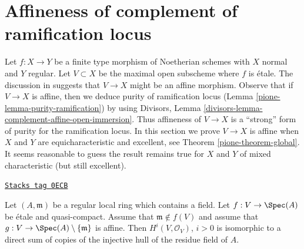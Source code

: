 \section{Affineness of complement of ramification locus}
\label{pione-section-stronger-purity}
Let $f : X \to Y$ be a finite type morphism of Noetherian schemes
with $X$ normal and $Y$ regular. Let $V \subset X$ be the maximal
open subscheme where $f$ is \'etale.
The discussion in \cite[Chapter IV, Section 21.12]{EGA}
suggests that $V \to X$ might be an affine morphism.
Observe that if $V \to X$ is affine, then we deduce purity of
ramification locus (Lemma \ref{pione-lemma-purity-ramification}) by
using Divisors, Lemma \ref{divisors-lemma-complement-affine-open-immersion}.
Thus affineness of $V \to X$ is a ``strong'' form of purity
for the ramification locus.
In this section we prove $V \to X$ is affine when
$X$ and $Y$ are equicharacteristic and excellent, see
Theorem \ref{pione-theorem-global}. It seems reasonable
to guess the result remains true for $X$ and $Y$
of mixed characteristic (but still excellent).

\begin{lemma}
\label{pione-lemma-structure-cohomology}
\href{https://stacks.math.columbia.edu/tag/0ECB}{\texttt{Stacks tag 0ECB}}

Let $(A, \mathfrak m)$ be a regular local ring which contains a field.
Let $f : V \to \Spec(A)$ be \'etale and quasi-compact.
Assume that $\mathfrak m \not \in f(V)$ and assume that
$g : V \to \Spec(A) \setminus \{\mathfrak m\}$ is affine.
Then $H^i(V, \mathcal{O}_V)$, $i > 0$ is isomorphic to a direct
sum of copies of the injective hull of the residue field of $A$.
\end{lemma}

